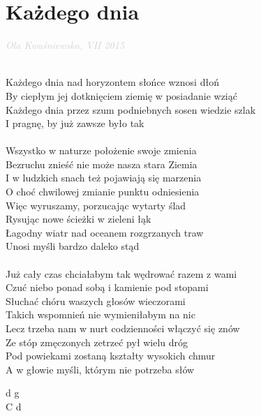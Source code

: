 \documentclass[a5paper, 10pt]{book}
\begin{document}
\newpage
\section{Każdego dnia}\textcolor{lightgray}{\textit{Ola Kwaśniewska, VII 2015}}\\~\\
\begin{minipage}[t]{0.8\textwidth}
\hspace*{5mm}Każdego dnia nad horyzontem słońce wznosi dłoń		\\
\hspace*{5mm}By ciepłym jej dotknięciem ziemię w posiadanie wziąć	\\
\hspace*{5mm}Każdego dnia przez szum podniebnych sosen wiedzie szlak\\
\hspace*{5mm}I pragnę, by już zawsze było tak\\
\\
Wszystko w naturze położenie swoje zmienia\\
Bezruchu znieść nie może nasza stara Ziemia\\
I w ludzkich snach też pojawiają się marzenia\\
O choć chwilowej zmianie punktu odniesienia\\
Więc wyruszamy, porzucając wytarty ślad\\
Rysując nowe ścieżki w zieleni łąk\\
Łagodny wiatr nad oceanem rozgrzanych traw\\
Unosi myśli bardzo daleko stąd\\
\\
Już cały czas chciałabym tak wędrować razem z wami\\
Czuć niebo ponad sobą i kamienie pod stopami\\
Słuchać chóru waszych głosów wieczorami\\
Takich wspomnień nie wymieniłabym na nic\\
Lecz trzeba nam w nurt codzienności włączyć się znów\\
Ze stóp zmęczonych zetrzeć pył wielu dróg\\
Pod powiekami zostaną kształty wysokich chmur\\
A w głowie myśli, którym nie potrzeba słów\\
\end{minipage}
\begin{minipage}[t]{0.2\textwidth}
d g\\
C d\\
\end{minipage}
\end{document}
